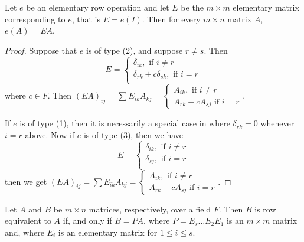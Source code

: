 \begin{theorem}\label{1.3.2}
    Let $e$ be an elementary row operation and let  $E$ be the  $m \times m$ elementary matrix
    corresponding to $e$, that is $E=e(I)$. Then for every $m \times n$ matrix  $A$,  $e(A)=EA$.
\end{theorem}
\begin{proof}
    Suppose that $e$ is of type (2), and suppose $r \neq s$. Then  
        \begin{equation*}
            E=\begin{cases}
                \delta_{ik}, \text{ if } i \neq r \\
                \delta_{rk}+c\delta_{sk}, \text{ if } i = r \\
               \end{cases}
        \end{equation*}
    where $c \in F$. Then  $(EA)_{ij}=\sum{E_{ik}A_{kj}} = \begin{cases}
                                            A_{ik}, \text{ if } i \neq r \\
                                            A_{rk}+cA_{sj} \text{ if } i=r
                                       \end{cases}$.

    If $e$ is of type (1), then it is necessarily a special case in where $\delta_{rk}=0$
    whenever $i=r$ above. Now if  $e$ is of type  (3), then we have
        \begin{equation*}
            E=\begin{cases}
                \delta_{ik}, \text{ if } i \neq r \\
                \delta_{sj}, \text{ if } i = r \\
               \end{cases}
        \end{equation*}
        then we get $(EA)_{ij}=\sum{E_{ik}A_{kj}} = \begin{cases}
                                            A_{ik}, \text{ if } i \neq r \\
                                            A_{rk}+cA_{sj} \text{ if } i=r
                                       \end{cases}$.
\end{proof}
\begin{corollary}
    Let $A$ and  $B$ be  $m \times n$ matrices, respectively, over a field  $F$. Then  $B$ is row
    equivalent to $A$ if, and only if  $B=PA$, where  $P=E_s \dots E_2E_1$ is an $m \times m$ matrix
    and, where $E_i$ is an elementary matrix for  $1 \leq i \leq s$.
\end{corollary}
